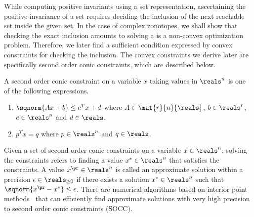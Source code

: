 While computing positive invariants using a set representation,
ascertaining the positive invariance of a set requires deciding the
inclusion of the next reachable set inside the given set.  In the case
of complex zonotopes, we shall show that checking the exact inclusion
amounts to solving a is a non-convex optimization problem.  Therefore,
we later find a sufficient condition expressed by convex constraints
for checking the inclusion.  The convex constraints we derive later
are specifically second order conic constraints, which are described
below.
%
\begin{definition}
A second order conic constraint on a variable $x$ taking values in
$\reals^n$ is one of the following expressions.
\begin{enumerate}
\item $\sqnorm{Ax+b}\leq c^Tx+d$ where $A\in\mat{r}{n}{\reals}$,
  $b\in\reals^r$, $c\in\reals^n$ and $d\in\reals$.
\item $p^Tx=q$ where $p\in\reals^n$ and $q\in\reals$.
\end{enumerate}
\end{definition}
%
Given a set of second order conic constraints on a variable
$x\in\reals^n$, solving the constraints refers to finding a value
$x^*\in\reals^n$ that satisfies the constraints.  A value
$x^\pr\in\reals^n$ is called an approximate solution within a
precision $\epsilon\in\reals_{\geq 0}$ if there exists a solution
$x^*\in\reals^n$ such that $\sqnorm{x^\pr-x^*}\leq \epsilon$.  There
are numerical algorithms based on interior point methods~\cite{todo}
that can efficiently find approximate solutions with very high
precision to second order conic constraints (SOCC).

